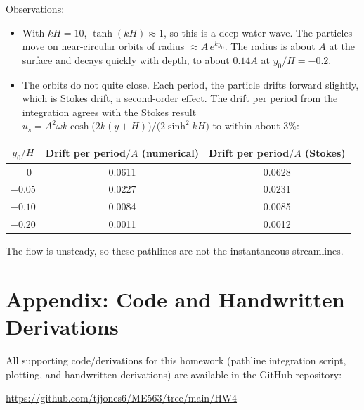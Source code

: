 \documentclass[11pt]{article}
\begin{document}
\noindent Observations:
\begin{itemize}
  \item With $kH = 10$, $\tanh(kH) \approx 1$, so this is a deep-water wave. The particles move on
  near-circular orbits of radius $\approx A\,e^{k y_0}$. The radius is about $A$ at the surface and
  decays quickly with depth, to about $0.14A$ at $y_0/H = -0.2$.
  \item The orbits do not quite close. Each period, the particle drifts forward slightly, which is
  Stokes drift, a second-order effect. The drift per period from the integration agrees with the
  Stokes result $\bar u_s = A^2\omega k\cosh\!\big(2k(y+H)\big)/\big(2\sinh^2 kH\big)$ to within
  about 3\%:
\end{itemize}
\begin{table}[H]
  \centering
  \begin{tabular}{ccc}
    \toprule
    $y_0/H$ & Drift per period$/A$ (numerical) & Drift per period$/A$ (Stokes) \\
    \midrule
    $\phantom{-}0$    & 0.0611 & 0.0628 \\
    $-0.05$           & 0.0227 & 0.0231 \\
    $-0.10$           & 0.0084 & 0.0085 \\
    $-0.20$           & 0.0011 & 0.0012 \\
    \bottomrule
  \end{tabular}
\end{table}
\noindent The flow is unsteady, so these pathlines are not the instantaneous streamlines.

\appendix
\section*{Appendix: Code and Handwritten Derivations}

All supporting code/derivations for this homework (pathline integration script, plotting,
and handwritten derivations) are available in the GitHub repository:
\begin{center}
    \url{https://github.com/tjjones6/ME563/tree/main/HW4}
\end{center}
\end{document}

